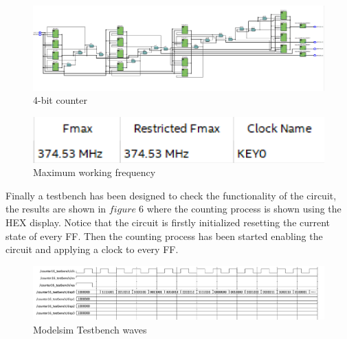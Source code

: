 \documentclass[12pt]{article}
\begin{document}
\begin{figure}[!h]
	\centering
	\includegraphics[scale = 0.4]{immagini/immagine42.PNG}
	\caption{4-bit counter}
\end{figure}
\vspace{10mm}
	\begin{figure}[h]
		\centering
		\includegraphics[scale = 0.9]{immagini/fmax.PNG}
		\caption{Maximum working frequency}
	\end{figure}
\newpage
Finally a testbench has been designed to check the functionality of the circuit, the results are shown in $figure\;6$ where the counting process is shown using the HEX display. Notice that the circuit is firstly initialized resetting the current state of every FF. Then the counting process has been started enabling the circuit and applying a clock to every FF.
		\begin{figure}[h]
			\centering
			\includegraphics[scale = 0.6]{immagini/testbench2.PNG}
			\caption{Modelsim Testbench waves}
\end{figure}
\end{document}
